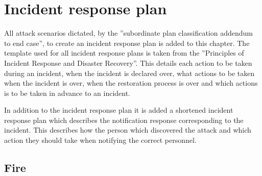 \section{Incident response plan}

All attack scenarios dictated, by the ”subordinate plan classification addendum to end case”, to create an incident response plan is added to this chapter. The template used for all incident response plans is taken from the ”Principles of Incident Response and Disaster Recovery”. This details each action to be taken during an incident, when the incident is declared over, what actions to be taken when the incident is over, when the restoration process is over and which actions is to be taken in advance to an incident.

In addition to the incident response plan it is added a shortened incident response plan which describes the notification response corresponding to the incident. This describes how the person which discovered the attack and which action they should take when notifying the correct personnel.

\subsection{Fire}

